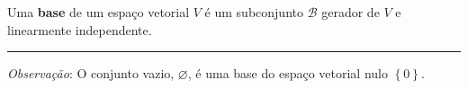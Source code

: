 \begin{definition}
	Uma \textbf{base} de um espaço vetorial $V$ é um subconjunto $\mathcal{B}$ gerador de $V$ e linearmente independente.
	
	\hrule
	
	\textit{Observação}: O conjunto vazio, $\varnothing$, é uma base do espaço vetorial nulo $\left\{0\right\}$.
\end{definition}